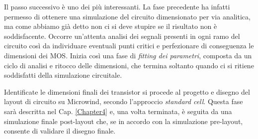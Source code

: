 Il passo successivo è uno dei più interessanti. La fase precedente ha infatti permesso di ottenere una simulazione del circuito dimensionato per via analitica, ma come abbiamo già detto non ci si deve stupire se il risultato non è soddisfacente. Occorre un'attenta analisi dei segnali presenti in ogni ramo del circuito così da individuare eventuali punti critici e perfezionare di conseguenza le dimensioni dei MOS. Inizia così una fase di \textit{fitting dei parametri}, composta da un ciclo di analisi e ritocco delle dimensioni, che termina soltanto quando ci si ritiene soddisfatti della simulazione circuitale. 

Identificate le dimensioni finali dei transistor si procede al progetto e disegno del layout di circuito su Microwind, secondo l'approccio \textit{standard cell}. Questa fase sarà descritta nel Cap. \ref{Chapter4} e, una volta terminata, è seguita da una simulazione finale post-layout che, se in accordo con la simulazione pre-layout, consente di validare il disegno finale. 








